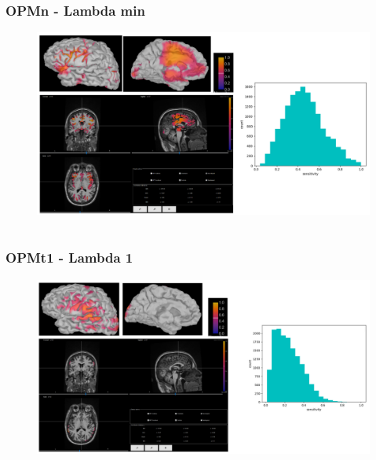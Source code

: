 \documentclass{beamer}
\numberwithin{figure}{section}
\numberwithin{equation}{section}
\begin{document}
\section{}
\begin{frame}
 \frametitle{OPMn - Lambda min}
	\begin{figure}[p]
  		\centering
  		\includegraphics[width=1\linewidth]{pictures/opmsen22}
  		\label{fig:approaches_RDF}
 	\end{figure}

  
\end{frame}
\section{}
\begin{frame}
 \frametitle{OPMt1 - Lambda 1}
	\begin{figure}[p]
  		\centering
  		\includegraphics[width=1\linewidth]{pictures/opmt100}
  		\label{fig:approaches_RDF}
 	\end{figure}

  
\end{frame}
\end{document}
